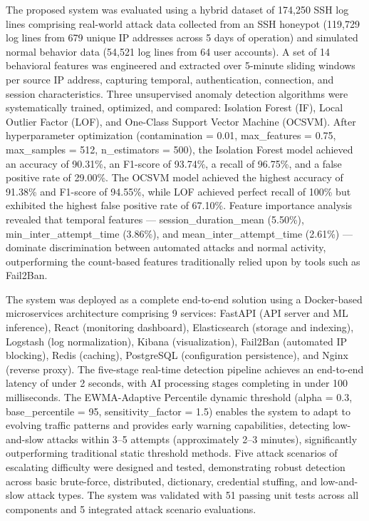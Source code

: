 \documentclass[
  a4paper]{report}
\begin{document}
The proposed system was evaluated using a hybrid dataset of 174,250 SSH
log lines comprising real-world attack data collected from an SSH
honeypot (119,729 log lines from 679 unique IP addresses across 5 days
of operation) and simulated normal behavior data (54,521 log lines from
64 user accounts). A set of 14 behavioral features was engineered and
extracted over 5-minute sliding windows per source IP address, capturing
temporal, authentication, connection, and session characteristics. Three
unsupervised anomaly detection algorithms were systematically trained,
optimized, and compared: Isolation Forest (IF), Local Outlier Factor
(LOF), and One-Class Support Vector Machine (OCSVM). After
hyperparameter optimization (contamination = 0.01, max\_features = 0.75,
max\_samples = 512, n\_estimators = 500), the Isolation Forest model
achieved an accuracy of 90.31\%, an F1-score of 93.74\%, a recall of
96.75\%, and a false positive rate of 29.00\%. The OCSVM model achieved
the highest accuracy of 91.38\% and F1-score of 94.55\%, while LOF
achieved perfect recall of 100\% but exhibited the highest false
positive rate of 67.10\%. Feature importance analysis revealed that
temporal features --- session\_duration\_mean (5.50\%),
min\_inter\_attempt\_time (3.86\%), and mean\_inter\_attempt\_time
(2.61\%) --- dominate discrimination between automated attacks and
normal activity, outperforming the count-based features traditionally
relied upon by tools such as Fail2Ban.

The system was deployed as a complete end-to-end solution using a
Docker-based microservices architecture comprising 9 services: FastAPI
(API server and ML inference), React (monitoring dashboard),
Elasticsearch (storage and indexing), Logstash (log normalization),
Kibana (visualization), Fail2Ban (automated IP blocking), Redis
(caching), PostgreSQL (configuration persistence), and Nginx (reverse
proxy). The five-stage real-time detection pipeline achieves an
end-to-end latency of under 2 seconds, with AI processing stages
completing in under 100 milliseconds. The EWMA-Adaptive Percentile
dynamic threshold (alpha = 0.3, base\_percentile = 95,
sensitivity\_factor = 1.5) enables the system to adapt to evolving
traffic patterns and provides early warning capabilities, detecting
low-and-slow attacks within 3--5 attempts (approximately 2--3 minutes),
significantly outperforming traditional static threshold methods. Five
attack scenarios of escalating difficulty were designed and tested,
demonstrating robust detection across basic brute-force, distributed,
dictionary, credential stuffing, and low-and-slow attack types. The
system was validated with 51 passing unit tests across all components
and 5 integrated attack scenario evaluations.
\end{document}
